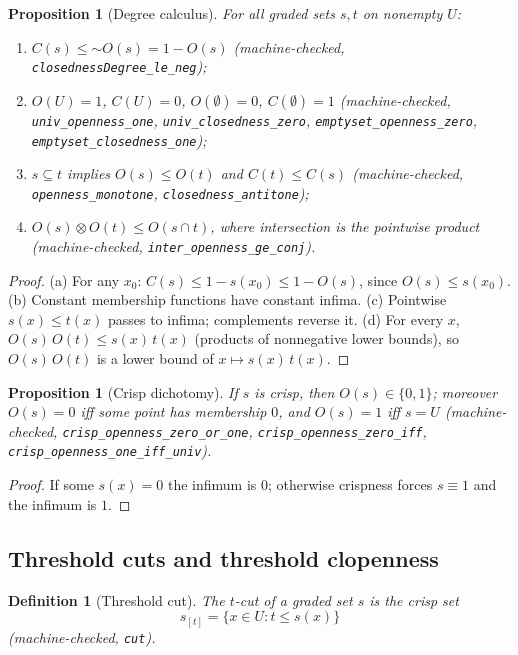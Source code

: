 \documentclass[11pt,a4paper]{article}
\newtheorem{proposition}[theorem]{Proposition}
\newtheorem{definition}[theorem]{Definition}
\newcommand{\negc}{\mathord{\sim}}
\newcommand{\conjc}{\otimes}
\begin{document}
\begin{proposition}[Degree calculus]
\label{thm:degrees}
For all graded sets $s, t$ on nonempty $U$:
\begin{enumerate}[label=\textup{(\alph*)},nosep]
\item $C(s) \le \negc O(s) = 1 - O(s)$
  (machine-checked, \texttt{closednessDegree\_le\_neg});
\item $O(U) = 1$, $C(U) = 0$, $O(\emptyset) = 0$,
  $C(\emptyset) = 1$
  (machine-checked, \texttt{univ\_openness\_one},
  \texttt{univ\_closedness\_zero},
  \texttt{emptyset\_openness\_zero},
  \texttt{emptyset\_closedness\_one});
\item $s \subseteq t$ implies $O(s) \le O(t)$ and $C(t) \le C(s)$
  (machine-checked, \texttt{openness\_monotone},
  \texttt{closedness\_antitone});
\item $O(s) \conjc O(t) \le O(s \cap t)$, where intersection is the
  pointwise product
  (machine-checked, \texttt{inter\_openness\_ge\_conj}).
\end{enumerate}
\end{proposition}
\begin{proof}
(a) For any $x_0$:
$C(s) \le 1 - s(x_0) \le 1 - O(s)$, since $O(s) \le s(x_0)$.
(b) Constant membership functions have constant infima.
(c) Pointwise $s(x) \le t(x)$ passes to infima; complements reverse it.
(d) For every $x$,
$O(s)\,O(t) \le s(x)\,t(x)$ (products of nonnegative lower bounds), so
$O(s)\,O(t)$ is a lower bound of $x \mapsto s(x)\,t(x)$.
\end{proof}

\begin{proposition}[Crisp dichotomy]
\label{thm:crisp-deg}
If $s$ is crisp, then $O(s) \in \{0, 1\}$; moreover $O(s) = 0$ iff some
point has membership $0$, and $O(s) = 1$ iff $s = U$
(machine-checked, \texttt{crisp\_openness\_zero\_or\_one},
\texttt{crisp\_openness\_zero\_iff},
\texttt{crisp\_openness\_one\_iff\_univ}).
\end{proposition}
\begin{proof}
If some $s(x) = 0$ the infimum is $0$; otherwise crispness forces
$s \equiv 1$ and the infimum is $1$.
\end{proof}

\subsection{Threshold cuts and threshold clopenness}

\begin{definition}[Threshold cut]
\label{def:cut}
The \emph{$t$-cut} of a graded set $s$ is the crisp set
\[
  s_{[t]} = \{x \in U : t \le s(x)\}
\]
(machine-checked, \texttt{cut}).
\end{definition}
\end{document}
